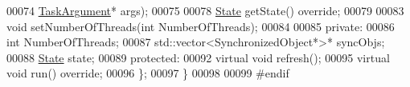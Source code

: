 \begin{DoxyCode}
00074                   \hyperlink{namespacedsf_abe4bf68433935a81c31a5ada9b17663a}{TaskArgument}* args);
00075         
00078         \hyperlink{classdsf_1_1_runnable_a8eb63b21a0accc7a6a2a05f18e257991}{State} getState() \textcolor{keyword}{override};
00079         
00083         \textcolor{keywordtype}{void} setNumberOfThreads(\textcolor{keywordtype}{int} NumberOfThreads);
00084         
00085     \textcolor{keyword}{private}:
00086         \textcolor{keywordtype}{int} NumberOfThreads;
00087         std::vector<SynchronizedObject*>* syncObjs;
00088         \hyperlink{classdsf_1_1_runnable_a8eb63b21a0accc7a6a2a05f18e257991}{State} state;
00089     \textcolor{keyword}{protected}:
00092         \textcolor{keyword}{virtual} \textcolor{keywordtype}{void} refresh();
00095          \textcolor{keyword}{virtual} \textcolor{keywordtype}{void} run() \textcolor{keyword}{override};
00096     \};
00097 \}
00098 
00099 \textcolor{preprocessor}{#endif}
\end{DoxyCode}
